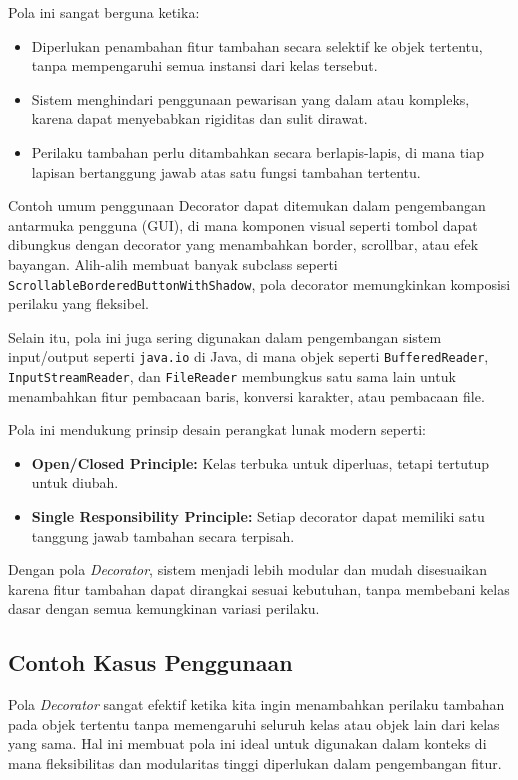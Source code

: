 Pola ini sangat berguna ketika:
\begin{itemize}
	\item Diperlukan penambahan fitur tambahan secara selektif ke objek tertentu, tanpa mempengaruhi semua instansi dari kelas tersebut.
	\item Sistem menghindari penggunaan pewarisan yang dalam atau kompleks, karena dapat menyebabkan rigiditas dan sulit dirawat.
	\item Perilaku tambahan perlu ditambahkan secara berlapis-lapis, di mana tiap lapisan bertanggung jawab atas satu fungsi tambahan tertentu.
\end{itemize}

Contoh umum penggunaan Decorator dapat ditemukan dalam pengembangan antarmuka pengguna (GUI), di mana komponen visual seperti tombol dapat dibungkus dengan decorator yang menambahkan border, scrollbar, atau efek bayangan. Alih-alih membuat banyak subclass seperti \texttt{ScrollableBorderedButtonWithShadow}, pola decorator memungkinkan komposisi perilaku yang fleksibel.

Selain itu, pola ini juga sering digunakan dalam pengembangan sistem input/output seperti \texttt{java.io} di Java, di mana objek seperti \texttt{BufferedReader}, \texttt{InputStreamReader}, dan \texttt{FileReader} membungkus satu sama lain untuk menambahkan fitur pembacaan baris, konversi karakter, atau pembacaan file.

Pola ini mendukung prinsip desain perangkat lunak modern seperti:
\begin{itemize}
	\item \textbf{Open/Closed Principle:} Kelas terbuka untuk diperluas, tetapi tertutup untuk diubah.
	\item \textbf{Single Responsibility Principle:} Setiap decorator dapat memiliki satu tanggung jawab tambahan secara terpisah.
\end{itemize}

Dengan pola \textit{Decorator}, sistem menjadi lebih modular dan mudah disesuaikan karena fitur tambahan dapat dirangkai sesuai kebutuhan, tanpa membebani kelas dasar dengan semua kemungkinan variasi perilaku.

\subsection{Contoh Kasus Penggunaan}

Pola \textit{Decorator} sangat efektif ketika kita ingin menambahkan perilaku tambahan pada objek tertentu tanpa memengaruhi seluruh kelas atau objek lain dari kelas yang sama. Hal ini membuat pola ini ideal untuk digunakan dalam konteks di mana fleksibilitas dan modularitas tinggi diperlukan dalam pengembangan fitur.

